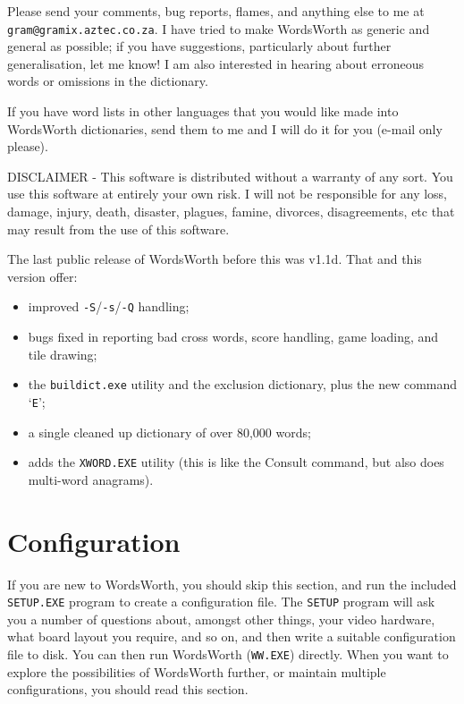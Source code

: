 Please send your comments, bug reports, flames, and anything
else to me at {\tt gram@gramix.aztec.co.za}.
I have tried to make WordsWorth
as generic and general as possible; if you have suggestions,
particularly about further generalisation, let me know! I am
also interested in hearing about erroneous words or omissions
in the dictionary.

If you have word lists in other languages that you would like
made into WordsWorth dictionaries, send them to me and I will
do it for you (e-mail only please).

DISCLAIMER - This software is distributed without a warranty of 
any sort. You use this software at entirely your own risk. I will
not be responsible for any loss, damage, injury, death, disaster,
plagues, famine, divorces, disagreements, etc that may result from
the use of this software.

The last public release of WordsWorth before this was v1.1d.
That and this version offer:

\begin{itemize}
\item improved {\tt -S}/{\tt -s}/{\tt -Q} handling;
\item bugs fixed in reporting bad cross words, score handling,
game loading, and tile drawing;
\item the {\tt buildict.exe} utility and the exclusion dictionary,
plus the new command `{\tt E}';
\item a single cleaned up dictionary of over 80,000 words;
\item adds the {\tt XWORD.EXE} utility (this is like the Consult command, but
also does multi-word anagrams).
\end{itemize}

\section{Configuration}

If you are new to WordsWorth, you should skip this section,
and run the included {\tt SETUP.EXE} program to create a
configuration file. The {\tt SETUP} program will ask you a number
of questions about, amongst other things, your video hardware,
what board layout you require, and so on, and then write a 
suitable configuration file to disk. You can then run
WordsWorth ({\tt WW.EXE}) directly. When you want to explore the 
possibilities of WordsWorth further, or maintain multiple 
configurations, you should read this section.

